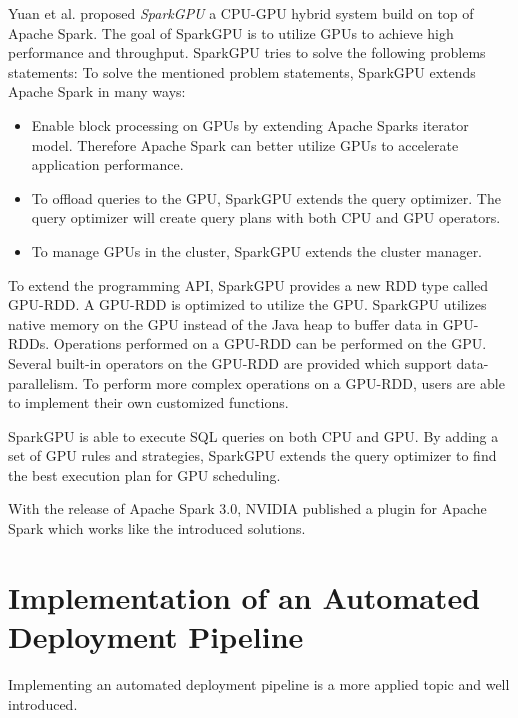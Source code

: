 Yuan et al. \cite{Yuan2016SparkGPU} proposed \textit{SparkGPU} a CPU-GPU hybrid system build on top of Apache Spark.
The goal of SparkGPU is to utilize GPUs to achieve high performance and throughput.
SparkGPU tries to solve the following problems statements:
To solve the mentioned problem statements, SparkGPU extends Apache Spark in many ways:
\begin{itemize}
\item Enable block processing on GPUs by extending Apache Sparks iterator model. Therefore Apache Spark can better utilize GPUs to accelerate application performance.

\item To offload queries to the GPU, SparkGPU extends the query optimizer. The query optimizer will create query plans with both CPU and GPU operators.

\item To manage GPUs in the cluster, SparkGPU extends the cluster manager.
\end{itemize}
To extend the programming API, SparkGPU provides a new RDD type called GPU-RDD.
A GPU-RDD is optimized to utilize the GPU.
SparkGPU utilizes native memory on the GPU instead of the Java heap to buffer data in GPU-RDDs.
Operations performed on a GPU-RDD can be performed on the GPU. Several built-in operators on the GPU-RDD are provided which support data-parallelism.
To perform more complex operations on a GPU-RDD, users are able to implement their own customized functions.


SparkGPU is able to execute SQL queries on both CPU and GPU.
By adding a set of GPU rules and strategies, SparkGPU extends the query optimizer to find the best execution plan for GPU scheduling.

With the release of Apache Spark 3.0, NVIDIA published a plugin for Apache Spark which works like the introduced solutions.


\section{Implementation of an Automated Deployment Pipeline}
Implementing an automated deployment pipeline is a more applied topic and well introduced.


